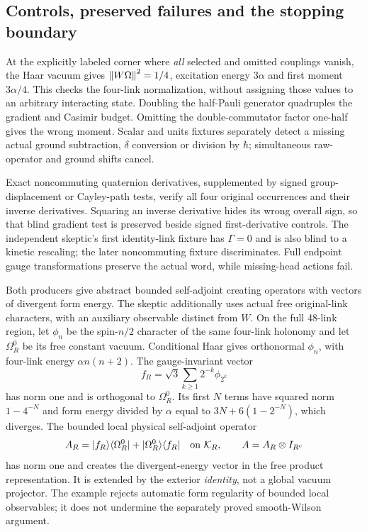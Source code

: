 \subsection{Controls, preserved failures and the stopping boundary}
At the explicitly labeled corner where \emph{all} selected and omitted couplings vanish, the Haar vacuum gives $\left\lVert W\Omega\right\rVert^2=1/4$, excitation energy $3\alpha$ and first moment $3\alpha/4$. This checks the four-link normalization, without assigning those values to an arbitrary interacting state. Doubling the half-Pauli generator quadruples the gradient and Casimir budget. Omitting the double-commutator factor one-half gives the wrong moment. Scalar and units fixtures separately detect a missing actual ground subtraction, $\delta$ conversion or division by $\hbar$; simultaneous raw-operator and ground shifts cancel.

Exact noncommuting quaternion derivatives, supplemented by signed group-displacement or Cayley-path tests, verify all four original occurrences and their inverse derivatives. Squaring an inverse derivative hides its wrong overall sign, so that blind gradient test is preserved beside signed first-derivative controls. The independent skeptic's first identity-link fixture has $\Gamma=0$ and is also blind to a kinetic rescaling; the later noncommuting fixture discriminates. Full endpoint gauge transformations preserve the actual word, while missing-head actions fail.

Both producers give abstract bounded self-adjoint creating operators with vectors of divergent form energy. The skeptic additionally uses actual free original-link characters, with an auxiliary observable distinct from $W$. On the full 48-link region, let $\phi_n$ be the spin-$n/2$ character of the same four-link holonomy and let $\Omega_R^0$ be its free constant vacuum. Conditional Haar gives orthonormal $\phi_n$, with four-link energy $\alpha n(n+2)$. The gauge-invariant vector
\begin{equation}
 f_R=\sqrt3\sum_{k\ge1}2^{-k}\phi_{2^k}
\end{equation}
has norm one and is orthogonal to $\Omega_R^0$. Its first $N$ terms have squared norm $1-4^{-N}$ and form energy divided by $\alpha$ equal to $3N+6(1-2^{-N})$, which diverges. The bounded local physical self-adjoint operator
\begin{equation}
 A_R=|f_R\rangle\langle\Omega_R^0|
       +|\Omega_R^0\rangle\langle f_R|
 \quad\hbox{on }\mathcal K_R,
 \qquad A=A_R\otimes I_{R^c}
 \label{eq:ak2-local-counter}
\end{equation}
has norm one and creates the divergent-energy vector in the free product representation. It is extended by the exterior \emph{identity}, not a global vacuum projector. The example rejects automatic form regularity of bounded local observables; it does not undermine the separately proved smooth-Wilson argument.

